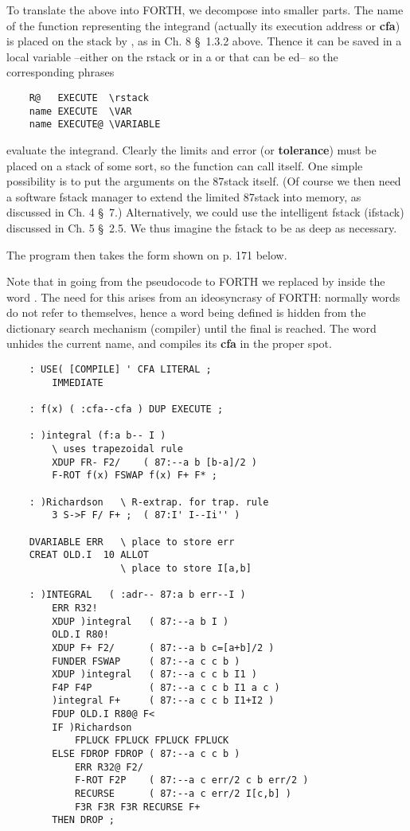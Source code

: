 To translate the above into FORTH, we decompose into smaller parts. The name of the function representing the integrand (actually its execution address or \textbf{cfa}) is placed on the stack by , as in Ch. 8 \S\ 1.3.2 above. Thence it can be saved in a local variable --either on the rstack or in a  or  that can be ed-- so the corresponding phrases

\begin{lstlisting}
    R@   EXECUTE  \rstack
    name EXECUTE  \VAR
    name EXECUTE@ \VARIABLE
\end{lstlisting}

evaluate the integrand. Clearly the limits and error (or \textbf{tolerance}) must be placed on a stack of some sort, so the function can call itself. One simple possibility is to put the arguments on the 87stack itself. (Of course we then need a software fstack manager to extend the limited 87stack into memory, as discussed in Ch. 4 \S\ 7.) Alternatively, we could use the intelligent fstack (ifstack) discussed in Ch. 5 \S\ 2.5. We thus imagine the fstack to be as deep as necessary.

The program then takes the form shown on p. 171 below.

Note that in going from the pseudocode to FORTH we replaced  by  inside the word . The need for this arises from an ideosyncrasy of FORTH: normally words do not refer to themselves, hence a word being defined is hidden from the dictionary search mechanism (compiler) until the final \bc{;} is reached. The word  unhides the current name, and compiles its \textbf{cfa} in the proper spot.

\begin{lstlisting}
    : USE( [COMPILE] ' CFA LITERAL ;
        IMMEDIATE
    
    : f(x) ( :cfa--cfa ) DUP EXECUTE ;
    
    : )integral (f:a b-- I )
        \ uses trapezoidal rule
        XDUP FR- F2/    ( 87:--a b [b-a]/2 )
        F-ROT f(x) FSWAP f(x) F+ F* ;
    
    : )Richardson   \ R-extrap. for trap. rule
        3 S->F F/ F+ ;  ( 87:I' I--Ii'' )

    DVARIABLE ERR   \ place to store err
    CREAT OLD.I  10 ALLOT
                    \ place to store I[a,b]

    : )INTEGRAL   ( :adr-- 87:a b err--I )
        ERR R32!
        XDUP )integral   ( 87:--a b I )
        OLD.I R80!
        XDUP F+ F2/      ( 87:--a b c=[a+b]/2 )
        FUNDER FSWAP     ( 87:--a c c b )
        XDUP )integral   ( 87:--a c c b I1 )
        F4P F4P          ( 87:--a c c b I1 a c )
        )integral F+     ( 87:--a c c b I1+I2 )
        FDUP OLD.I R80@ F<
        IF )Richardson
            FPLUCK FPLUCK FPLUCK FPLUCK
        ELSE FDROP FDROP ( 87:--a c c b )
            ERR R32@ F2/
            F-ROT F2P    ( 87:--a c err/2 c b err/2 )
            RECURSE      ( 87:--a c err/2 I[c,b] )
            F3R F3R F3R RECURSE F+
        THEN DROP ;
\end{lstlisting}

